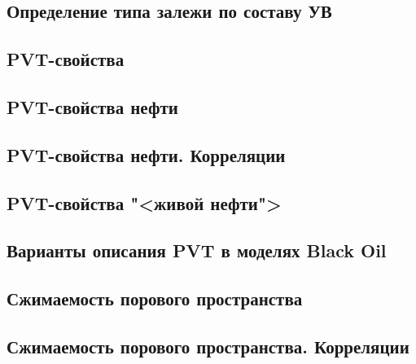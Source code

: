 \documentclass[main.tex]{subfiles}
\begin{document}
\subsection{Определение типа залежи по составу УВ}

\subsection{PVT-свойства}

\subsection{PVT-свойства нефти}

\subsection{PVT-свойства нефти. Корреляции}

\subsection{PVT-свойства "<живой нефти">}

\subsection{Варианты описания PVT в моделях Black Oil}

\subsection{Сжимаемость порового пространства}

\subsection{Сжимаемость порового пространства. Корреляции}
\end{document}
